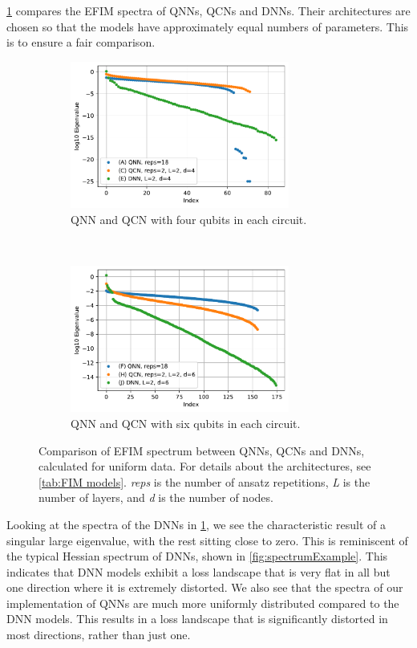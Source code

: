 \cref{fig:FIM Comparison} compares the EFIM spectra of QNNs, QCNs and DNNs. Their architectures are chosen so that the models have approximately equal numbers of parameters. This is to ensure a fair comparison. 

\begin{figure}[H]
    \centering
    \begin{subfigure}[t]{0.5\textwidth}
        \centering
        \includegraphics[height=1.9in]{latex/figures/FIM_qubits_4.pdf}
        \caption{QNN and QCN with four qubits in each circuit.}
    \end{subfigure}%
    ~ 
    \begin{subfigure}[t]{0.5\textwidth}
        \centering
        \includegraphics[height=1.9in]{latex/figures/FIM_qubits_6.pdf}
        \caption{QNN and QCN with six qubits in each circuit.}
    \end{subfigure}
    \caption{Comparison of EFIM spectrum between QNNs, QCNs and DNNs, calculated for uniform data. For details about the architectures, see \cref{tab:FIM models}. \emph{reps} is the number of ansatz repetitions, \emph{L} is the number of layers, and \emph{d} is the number of nodes.}
    \label{fig:FIM Comparison}
\end{figure}

Looking at the spectra of the DNNs in \cref{fig:FIM Comparison}, we see the characteristic result of a singular large eigenvalue, with the rest sitting close to zero. This is reminiscent of the typical Hessian spectrum of DNNs, shown in \cref{fig:spectrumExample}.  This indicates that DNN models exhibit a loss landscape that is very flat in all but one direction where it is extremely distorted. We also see that the spectra of our implementation of QNNs are much more uniformly distributed compared to the DNN models. This results in a loss landscape that is significantly distorted in most directions, rather than just one. 


